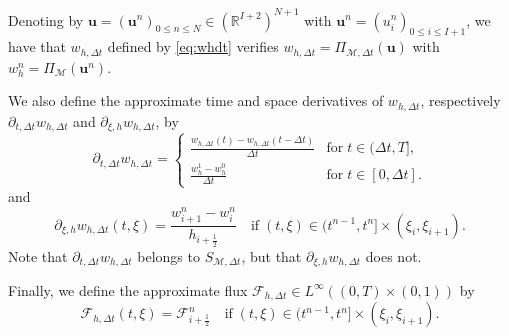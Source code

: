 \documentclass{amsart}
\newcommand\dt{\Delta t}
\newcommand\R{\mathbb{R}}
\newcommand\Mm{{\mathcal M}}
\newcommand\Ff{{\mathcal F}}
\newcommand\bu{{\boldsymbol u}}
\begin{document}
Denoting by $\bu = \left(\bu^n\right)_{0 \leq n \leq N} \in \left(\R^{I+2}\right)^{N+1}$ with $\bu^n = \left(u_i^n\right)_{0\leq i \leq I+1}$, we have that $w_{h,\dt}$ defined by \eqref{eq:whdt} verifies \(w_{h,\dt} = \Pi_{\Mm,\dt} (\bu)\) with \(w_h^n = \Pi_{\Mm}(\bu^n)\).

We also define the approximate time and space derivatives of $w_{h,\dt}$, respectively $\partial_{t,\dt} w_{h,\dt}$ and $\partial_{\xi,h} w_{h,\dt}$, by 
\begin{equation}\label{eq:dtwhdt}
\partial_{t,\dt} w_{h,\dt} = \begin{cases}
\frac{w_{h,\dt}(t) - w_{h,\dt}(t-\dt)}{\dt} & \text{for}\; t \in (\dt, T], \\
\frac{w_{h}^1 - w_h^0}{\dt} & \text{for}\; t \in [0,\dt]. 
\end{cases}
\end{equation}
and 
\begin{equation}\label{eq:dxiwhdt}
\partial_{\xi,h} w_{h,\dt}(t,\xi) = \frac{w_{i+1}^n - w_i^n}{h_{i+\frac12}} \quad \text{if}\; (t,\xi) \in (t^{n-1},t^n] \times (\xi_i, \xi_{i+1}).
\end{equation}
Note that $\partial_{t,\dt} w_{h,\dt}$ belongs to $S_{\Mm,\dt}$, but that $\partial_{\xi,h} w_{h,\dt}$ does not.

Finally, we define the approximate flux $\Ff_{h,\dt} \in L^\infty((0,T) \times (0,1))$ by 
\begin{equation}\label{eq:Fhdt}
\Ff_{h,\dt}(t,\xi) = \Ff_{i+\frac12}^n \quad \text{if}\; (t,\xi) \in (t^{n-1},t^n] \times (\xi_i, \xi_{i+1}).
\end{equation}
\end{document}
